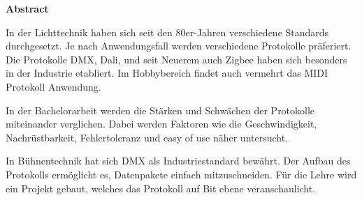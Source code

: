 \thispagestyle{plain} %

{\huge\textbf{Abstract}}
\vspace{1cm}

In der Lichttechnik haben sich seit den 80er-Jahren verschiedene Standards durchgesetzt. Je nach Anwendungsfall werden verschiedene Protokolle präferiert. Die Protokolle DMX, Dali, und seit Neuerem auch Zigbee haben sich besonders in der Industrie etabliert. Im Hobbybereich findet auch vermehrt das MIDI Protokoll Anwendung.

In der Bachelorarbeit werden die Stärken und Schwächen der Protokolle miteinander verglichen. Dabei werden Faktoren wie die Geschwindigkeit, Nachrüstbarkeit, Fehlertoleranz und easy of use näher untersucht.

In Bühnentechnik hat sich DMX als Industriestandard bewährt. Der Aufbau des Protokolls ermöglicht es, Datenpakete einfach mitzuschneiden. Für die Lehre wird ein Projekt gebaut, welches das Protokoll auf Bit ebene veranschaulicht.

